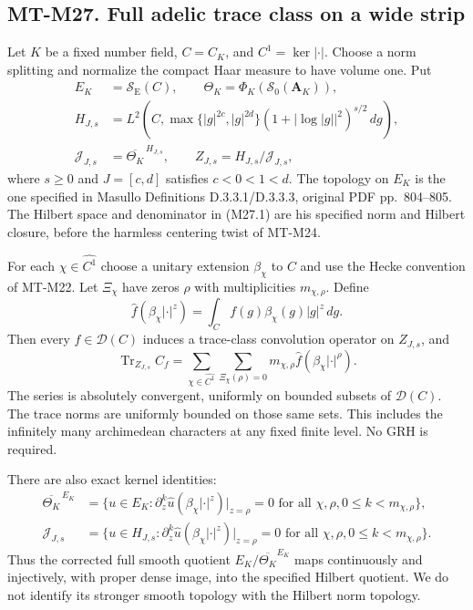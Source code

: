 \subsection*{MT-M27. Full adelic trace class on a wide strip}
Let $K$ be a fixed number field, $C=C_K$, and
$C^1=\ker|\cdot|$. Choose a norm splitting and normalize
the compact Haar measure to have volume one. Put
\[
 \begin{split}
 E_K&=\mathcal S_{\mathrm E}(C),\qquad
 \Theta_K=\Phi_K(\mathcal S_0(\mathbf A_K)),\\
 H_{J,s}&=L^2\!\left(C,
       \max\{|g|^{2c},|g|^{2d}\}
       (1+|\log|g||^2)^{s/2}\,dg\right),\\
 \mathcal J_{J,s}&=\overline{\Theta_K}^{\,H_{J,s}},
 \qquad Z_{J,s}=H_{J,s}/\mathcal J_{J,s},
 \end{split}                                                    \tag{M27.1}
\]
where $s\ge0$ and $J=[c,d]$ satisfies $c<0<1<d$.
The topology on $E_K$ is the one specified in Masullo
Definitions D.3.3.1/D.3.3.3, original PDF pp.~804--805.
The Hilbert space and denominator in (M27.1) are his
specified norm and Hilbert closure, before the harmless
centering twist of MT-M24.

For each $\chi\in\widehat{C^1}$ choose a unitary extension
$\beta_\chi$ to $C$ and use the Hecke convention of MT-M22.
Let $\Xi_\chi$ have zeros $\rho$ with multiplicities
$m_{\chi,\rho}$. Define
\[
 \widehat f(\beta_\chi|\cdot|^z)
       =\int_C f(g)\beta_\chi(g)|g|^z\,dg.
                                                               \tag{M27.2}
\]
Then every $f\in\mathcal D(C)$ induces a trace-class
convolution operator on $Z_{J,s}$, and
\[
 \operatorname{Tr}_{Z_{J,s}}C_f
     =\sum_{\chi\in\widehat{C^1}}
        \sum_{\Xi_\chi(\rho)=0}
                   m_{\chi,\rho}
                     \widehat f(\beta_\chi|\cdot|^\rho).
                                                               \tag{M27.3}
\]
The series is absolutely convergent, uniformly on bounded
subsets of $\mathcal D(C)$. The trace norms are uniformly
bounded on those same sets. This includes the infinitely
many archimedean characters at any fixed finite level.
No GRH is required.

There are also exact kernel identities:
\[
 \begin{split}
 \overline{\Theta_K}^{\,E_K}
   &=\{u\in E_K:
      \partial_z^k\widehat u(\beta_\chi|\cdot|^z)|_{z=\rho}=0
            \text{ for all }\chi,\rho,0\le k<m_{\chi,\rho}\},\\
 \mathcal J_{J,s}
   &=\{u\in H_{J,s}:
      \partial_z^k\widehat u(\beta_\chi|\cdot|^z)|_{z=\rho}=0
            \text{ for all }\chi,\rho,0\le k<m_{\chi,\rho}\}.
 \end{split}                                                    \tag{M27.4}
\]
Thus the corrected full smooth quotient
$E_K/\overline{\Theta_K}^{E_K}$ maps continuously and
injectively, with proper dense image, into the specified
Hilbert quotient. We do not identify its stronger smooth
topology with the Hilbert norm topology.

